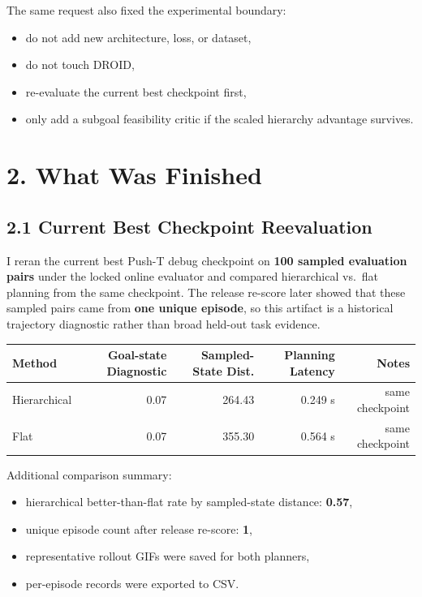 \documentclass[11pt]{article}
\begin{document}
The same request also fixed the experimental boundary:

\begin{itemize}
\item do not add new architecture, loss, or dataset,
\item do not touch DROID,
\item re-evaluate the current best checkpoint first,
\item only add a subgoal feasibility critic if the scaled hierarchy advantage survives.
\end{itemize}

\section*{2. What Was Finished}

\subsection*{2.1 Current Best Checkpoint Reevaluation}

I reran the current best Push-T debug checkpoint on \textbf{100 sampled evaluation pairs} under the locked online evaluator and compared hierarchical vs.\ flat planning from the same checkpoint.
The release re-score later showed that these sampled pairs came from \textbf{one unique episode}, so this artifact is a historical trajectory diagnostic rather than broad held-out task evidence.

\begin{center}
\begin{tabular}{lrrrr}
\toprule
\rowcolor{ReportBlue!10}
Method & Goal-state Diagnostic & Sampled-State Dist. & Planning Latency & Notes \\
\midrule
Hierarchical & 0.07 & 264.43 & 0.249 s & same checkpoint \\
Flat & 0.07 & 355.30 & 0.564 s & same checkpoint \\
\bottomrule
\end{tabular}
\end{center}

Additional comparison summary:

\begin{itemize}
\item hierarchical better-than-flat rate by sampled-state distance: \textbf{0.57},
\item unique episode count after release re-score: \textbf{1},
\item representative rollout GIFs were saved for both planners,
\item per-episode records were exported to CSV.
\end{itemize}
\end{document}
